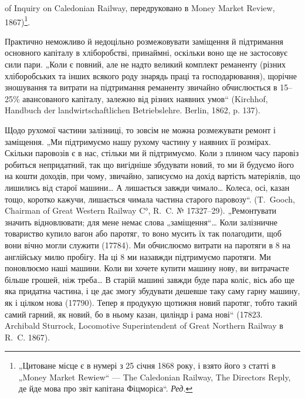 \parcont{}  %
of Inquiry on Caledonian Railway, передруковано в Money Market Review, 1867)\footnote*{
„Цитоване місце є в нумері з 25 січня 1868 року, і взято його з статті
в „Money Market Rewiew“ — The Caledonian Railway, The Directors Reply, де йде мова про звіт капітана Фіцморіса“. \emph{Ред.}
}.

Практично неможливо й недоцільно розмежовувати заміщення й підтримання основного капіталу в
хліборобстві, принаймні, оскільки воно ще не застосовує сили пари. „Коли є повний, але не надто
великий комплект реманенту (різних хліборобських та інших всякого роду знарядь праці та
господарювання), щорічне зношування та витрати на підтримання реманенту звичайно обчислюється в
15--25\% авансованого капіталу, залежно від різних наявних умов“ (Kirchhof, Handbuch der
landwirtschaftlichen Betriebslehre. Berlin, 1862, p. 137).

Щодо рухомої частини залізниці, то зовсім не можна розмежувати ремонт і заміщення. „Ми підтримуємо
нашу рухому частину у наявних її розмірах. Скільки паровозів є в нас, стільки ми й підтримуємо. Коли
з плином часу паровіз робиться непридатний, так що вигідніше збудувати новий, то ми й будуємо його
на кошти доходів, при чому, звичайно, записуємо на дохід вартість матеріялів, що лишились від старої
машини\dots{} А лишається завжди чимало\dots{} Колеса, осі, казан тощо, коротко кажучи, лишається чимала частина
старого паровозу“. (T.~Gooch, Chairman of Great Western Railway C°, R.~C. № \num{17327}--29). „Ремонтувати
значить відновлювати; для мене немає слова „заміщення“\dots{} Коли залізничне товариство купило вагон
або паротяг, то воно мусить їх так полагодити, щоб вони вічно могли служити (\num{17784}). Ми обчислюємо
витрати на паротяги в 8 на англійську милю пробігу. На ці 8 ми назавжди
підтримуємо паротяги. Ми поновлюємо наші машини. Коли ви хочете купити машину нову, ви витрачаєте
більше грошей, ніж треба\dots{} В старій машині завжди буде пара коліс, вісь або ще яка придатна
частина, і це дає змогу збудувати дешевше таку саму гарну машину, як і цілком нова (\num{17790}). Тепер я
продукую щотижня новий паротяг, тобто такий самий гарний, як новий, бо в ньому казан, циліндр і рама
нові“ (\num{17823}. Archibald Sturrock, Locomotive Superintendent of Great Northern Railway в R.~C. 1867).

